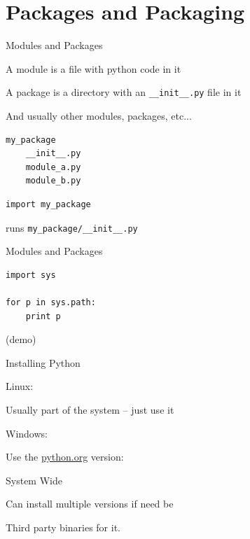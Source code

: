 \documentclass{beamer}
\begin{document}
\section{Packages and Packaging}

\begin{frame}[fragile]{Modules and Packages}

\vfill
{\Large A module is a file with python code in it}

\vfill
{\Large A package is a directory with an \verb|__init__.py| file in it}

\vfill
{\Large And usually other modules, packages, etc...}

\begin{verbatim}
my_package
    __init__.py
    module_a.py
    module_b.py
\end{verbatim}

\begin{verbatim}
import my_package
\end{verbatim}

runs \verb|my_package/__init__.py|

\end{frame} 


\begin{frame}[fragile]{Modules and Packages}

\vfill
\begin{verbatim}
import sys

for p in sys.path:
    print p

\end{verbatim}

\vfill
(demo)
\end{frame} 

\begin{frame}[fragile]{Installing Python}

{\Large Linux:}

Usually part of the system -- just use it

\vfill
{\Large Windows:}

\vfill
Use the \url{python.org} version:

\vfill
System Wide

\vfill
Can install multiple versions if need be

\vfill
Third party binaries for it.

\end{frame} 
\end{document}
